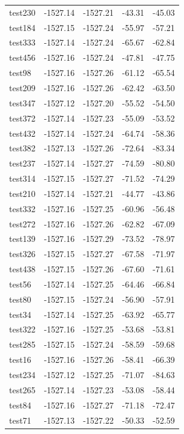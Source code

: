 \documentclass[journal=jacsat,manuscript=article]{achemso}
\begin{document}
\begin{table}[b!]
\begin{tabular}{lrrrr}
test230 &  -1527.14 &  -1527.21 &  -43.31 &  -45.03 \\
test184 &  -1527.15 &  -1527.24 &  -55.97 &  -57.21 \\
test333 &  -1527.14 &  -1527.24 &  -65.67 &  -62.84 \\
test456 &  -1527.16 &  -1527.24 &  -47.81 &  -47.75 \\
test98  &  -1527.16 &  -1527.26 &  -61.12 &  -65.54 \\
test209 &  -1527.16 &  -1527.26 &  -62.42 &  -63.50 \\
test347 &  -1527.12 &  -1527.20 &  -55.52 &  -54.50 \\
test372 &  -1527.14 &  -1527.23 &  -55.09 &  -53.52 \\
test432 &  -1527.14 &  -1527.24 &  -64.74 &  -58.36 \\
test382 &  -1527.13 &  -1527.26 &  -72.64 &  -83.34 \\
test237 &  -1527.14 &  -1527.27 &  -74.59 &  -80.80 \\
test314 &  -1527.15 &  -1527.27 &  -71.52 &  -74.29 \\
test210 &  -1527.14 &  -1527.21 &  -44.77 &  -43.86 \\
test332 &  -1527.16 &  -1527.25 &  -60.96 &  -56.48 \\
test272 &  -1527.16 &  -1527.26 &  -62.82 &  -67.09 \\
test139 &  -1527.16 &  -1527.29 &  -73.52 &  -78.97 \\
test326 &  -1527.15 &  -1527.27 &  -67.58 &  -71.97 \\
test438 &  -1527.15 &  -1527.26 &  -67.60 &  -71.61 \\
test56  &  -1527.14 &  -1527.25 &  -64.46 &  -66.84 \\
test80  &  -1527.15 &  -1527.24 &  -56.90 &  -57.91 \\
test34  &  -1527.14 &  -1527.25 &  -63.92 &  -65.77 \\
test322 &  -1527.16 &  -1527.25 &  -53.68 &  -53.81 \\
test285 &  -1527.15 &  -1527.24 &  -58.59 &  -59.68 \\
test16  &  -1527.16 &  -1527.26 &  -58.41 &  -66.39 \\
test234 &  -1527.12 &  -1527.25 &  -71.07 &  -84.63 \\
test265 &  -1527.14 &  -1527.23 &  -53.08 &  -58.44 \\
test84  &  -1527.16 &  -1527.27 &  -71.18 &  -72.47 \\
test71  &  -1527.13 &  -1527.22 &  -50.33 &  -52.59 \\

\end{tabular}
\end{table}
\end{document}

